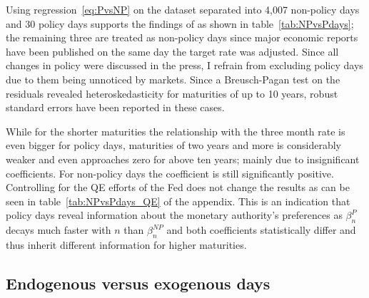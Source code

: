 Using regression~\eqref{eq:PvsNP} on the dataset separated into 4,007 non-policy days and 30 policy days supports the findings of \textcite{Ellingsen.2003} as shown in table~\vref{tab:NPvsPdays}; the remaining three are treated as non-policy days since major economic reports have been published on the same day the target rate was adjusted. Since all changes in policy were discussed in the press, I refrain from excluding policy days due to them being unnoticed by markets. Since a Breusch-Pagan test on the residuals revealed heteroskedasticity for maturities of up to 10 years, robust standard errors have been reported in these cases.

%
While for the shorter maturities the relationship with the three month rate is even bigger for policy days, maturities of two years and more is considerably weaker and even approaches zero for above ten years; mainly due to insignificant coefficients. For non-policy days the coefficient is still significantly positive. Controlling for the QE efforts of the Fed does not change the results as can be seen in table~\vref{tab:NPvsPdays_QE} of the appendix. This is an indication that policy days reveal information about the monetary authority's preferences as $\beta_n^{P}$ decays much faster with $n$ than $\beta_n^{NP}$ and both coefficients statistically differ and thus inherit different information for higher maturities.

\subsection{Endogenous versus exogenous days}

